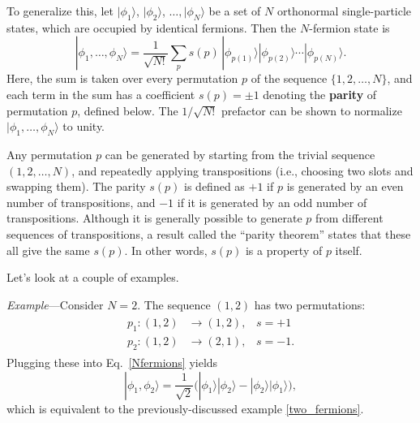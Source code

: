\documentclass[prx,12pt]{revtex4-2}
\begin{document}
To generalize this, let $|\phi_1\rangle$, $|\phi_2\rangle$, $\dots,
|\phi_N\rangle$ be a set of $N$ orthonormal single-particle states,
which are occupied by identical fermions.  Then the $N$-fermion state
is
\begin{equation}
  |\phi_1,\dots,\phi_N\rangle = \frac{1}{\sqrt{N!}} \sum_p s(p)\, |\phi_{p(1)}\rangle |\phi_{p(2)}\rangle \cdots |\phi_{p(N)}\rangle.
  \label{Nfermions}
\end{equation}
Here, the sum is taken over every permutation $p$ of the sequence
$\{1,2,\dots,N\}$, and each term in the sum has a coefficient $s(p) =
\pm1$ denoting the \textbf{parity} of permutation $p$, defined below.
The $1/\sqrt{N!}$ prefactor can be shown to normalize
$|\phi_1,\dots,\phi_N\rangle$ to unity.

Any permutation $p$ can be generated by starting from the trivial
sequence $(1, 2, \dots, N)$, and repeatedly applying transpositions
(i.e., choosing two slots and swapping them).  The parity $s(p)$ is
defined as $+1$ if $p$ is generated by an even number of
transpositions, and $-1$ if it is generated by an odd number of
transpositions.  Although it is generally possible to generate $p$
from different sequences of transpositions, a result called the
``parity theorem'' states that these all give the same $s(p)$.  In
other words, $s(p)$ is a property of $p$ itself.

\clearpage
Let's look at a couple of examples.

\begin{framed}
\noindent
\textit{Example}---Consider $N=2$.  The sequence $(1,2)$
has two permutations:
\begin{align}
  \begin{aligned}
    p_1 : (1,2) &\rightarrow (1,2), \;\;\;s = +1 \\ p_2 : (1,2) &\rightarrow (2,1), \;\;\;s = -1.\end{aligned}
\end{align}
Plugging these into Eq.~\eqref{Nfermions} yields
\begin{equation*}
  |\phi_1,\phi_2\rangle = \frac{1}{\sqrt{2}}
  \Big(|\phi_1\rangle|\phi_2\rangle - |\phi_2\rangle|\phi_1\rangle\Big),
\end{equation*}
which is equivalent to the previously-discussed example
\eqref{two_fermions}.
\end{framed}
\end{document}
